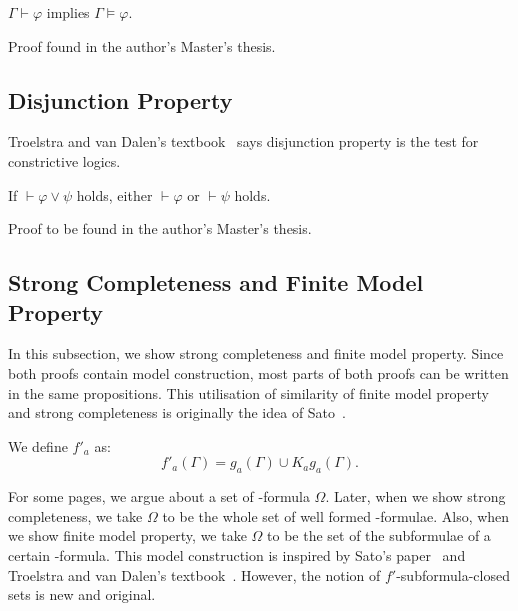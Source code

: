   \begin{proposition}[Soundness]
   \label{soundness}
   $\Gamma\vdash\varphi$ implies $\Gamma\models\varphi$.
  \end{proposition}
  Proof found in the author's Master's thesis.

  \subsection{Disjunction Property}

  Troelstra and van Dalen's
  textbook~\cite[3.5]{troelstra1988constructivism} says
  disjunction property is the test for constrictive logics.

   \begin{proposition}
    \label{disjunction-property}
    If $\vdash\varphi\vee\psi$ holds, either $\vdash\varphi$ or $\vdash\psi$ holds.
   \end{proposition}
   Proof to be found in the author's Master's thesis.

  \subsection{Strong Completeness and Finite Model Property}

  In this subsection, we show strong completeness and finite model property.
  Since both proofs contain model construction,
  most parts of both proofs can be written in the same propositions.
  This utilisation of similarity of finite model property and strong completeness
  is originally the idea of
  Sato~\cite{sato13study}.

  \begin{definition}
   We define $f'_a$ as:
   \[
   f'_a(\Gamma) = g_a(\Gamma) \cup K_ag_a(\Gamma).
   \]
  \end{definition}

  For some pages, we argue about a
  set of \iec-formula $\Omega$. Later, when we show
  strong completeness, we take $\Omega$ to be the whole set of well formed \iec-formulae.  Also,
  when we show finite model property, we take $\Omega$ to be the set of the subformulae of a
  certain \iec-formula.  This model construction is inspired by
  Sato's paper~\cite{sato13study}
  and Troelstra and van Dalen's textbook~\cite{troelstra1988constructivism}.
  However, the notion of $f'$-subformula-closed sets is new and original.

